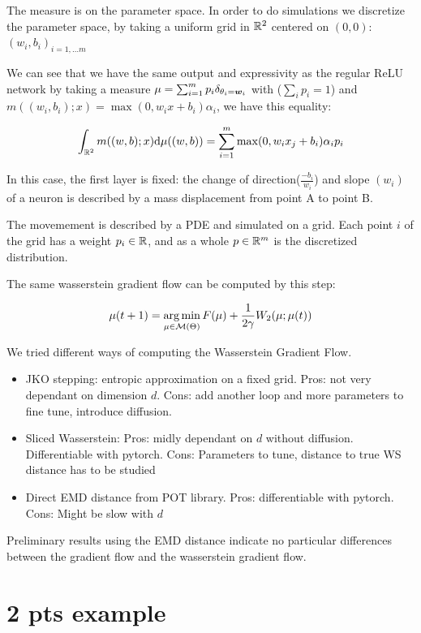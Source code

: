 The measure is on the parameter space. In order to do simulations we discretize the parameter space, by taking a uniform grid in $\mathbb{R}^2$ centered on $(0, 0)$: $(w_i, b_i)_{i=1, \dots m}$

We can see that we have the same output and expressivity as the regular ReLU network by taking a measure $\mu = \sum_{i=1}^{m} p_i \delta_{\theta_i = {\bm{w}}_i}$ with ($\sum_i p_i=1$) and $m((w_i, b_i); x) = \max(0, w_i x + b_i) \alpha_i$, we have this equality:

\begin{equation}
	\int_{\mathbb{R}^2} m((w, b); x) \mathrm{d} \mu((w, b)) = \sum_{i=1}^{m} \max(0, w_i x_j + b_i) \alpha_i p_i
\end{equation}

In this case, the first layer is fixed: the change of direction($\frac{-b_i}{w_i}$) and slope $(w_i)$ of a neuron is described by a mass displacement from point A to point B. 

The movemement is described by a PDE and simulated on a grid. Each point $i$ of the grid has a weight $p_i \in \mathbb{R}$, and as a whole $p \in \mathbb{R}^m$ is the discretized distribution.

The same wasserstein gradient flow can be computed by this step:

\begin{equation}
	\mu(t+1) = \operatorname*{arg\,min}_{\mu \in \mathcal{M}(\Theta)} F(\mu) + \frac{1}{2 \gamma} W_2(\mu; \mu(t))
\end{equation}

We tried different ways of computing the Wasserstein Gradient Flow. 

\begin{itemize}
	\item JKO stepping: entropic approximation on a fixed grid. Pros: not very dependant on dimension $d$. Cons: add another loop and more parameters to fine tune, introduce diffusion.
		\item Sliced Wasserstein: Pros: midly dependant on $d$ without diffusion. Differentiable with pytorch. Cons: Parameters to tune, distance to true WS distance has to be studied
		\item Direct EMD distance from POT library. Pros: differentiable with pytorch. Cons: Might be slow with $d$
\end{itemize}

Preliminary results using the EMD distance indicate no particular differences between the gradient flow and the wasserstein gradient flow.


\section{2 pts example}

